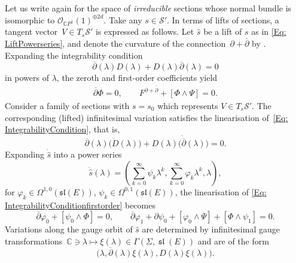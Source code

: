 \documentclass[pdftex]{sigma}
\numberwithin{equation}{section}
\theoremstyle{definition}
\newcommand{\lie}[1]{\operatorname{\mathfrak{#1}}}
\newcommand{\sln}{\lie{sl}}
\newcommand\C{{\mathbb C}}
\begin{document}
Let us write again  for the space of \emph{irreducible}
sections whose normal bundle is isomorphic to $\mathcal{O}_{\C P^1}(1)^{\oplus 2d}$. Take any $s \in
\mathcal S'$. In terms of lifts of sections, a tangent vector~${V\in T_s \mathcal{S}'}$ is expressed as
follows. Let $\widehat{s}$ be a lift of $s$ as in \eqref{Eq: LiftPowerseries}, and denote the
curvature of the connection~${\partial+{\overline{\partial}}}$ by . Expanding the integrability
condition
\begin{equation}\label{Eq: IntegrabilityCondition}
\overline{\partial}(\lambda)D(\lambda) + D(\lambda)\overline{\partial}(\lambda) = 0
\end{equation}
in powers of $\lambda$, the zeroth and first-order coefficients yield
\begin{align}\label{Eq: IntegrabilityConditionfirstorder}
\overline{\partial}\Phi = 0,\qquad
F^{\partial + {\overline{\partial}}} + [\Phi\wedge \Psi] = 0 .
\end{align}
Consider a family of sections  with $s = s_0$ which
represents $V \in T_s \mathcal{S}'$.
The corresponding (lifted) infinitesimal variation  satisfies the linearisation
of~\eqref{Eq: IntegrabilityCondition}, that is,
\begin{equation}\label{Eq: Intsdot}
{\overline{\partial}}(\lambda)\bigl(\dot D(\lambda)\bigr) + D(\lambda)\bigl(\dot{{\overline{\partial}}}(\lambda)\bigr) = 0.
\end{equation}
Expanding $\dot{\widehat{s}}$ into a power series
 \[%
\dot{\widehat{s}}(\lambda) = \left(\sum_{k=0}^\infty\psi_k\lambda^k,
\sum_{k=0}^\infty \varphi_k\lambda^k, \lambda \right) ,
\]
for $\varphi_k \in \Omega^{1,0}(\mathfrak{sl}(E))$, $\psi_k \in \Omega^{0,1}(\mathfrak{sl}(E))$, the linearisation
of \eqref{Eq: IntegrabilityConditionfirstorder} becomes
\[%
\overline{\partial}\varphi_0 + [\psi_0\wedge\Phi] = 0,\qquad
\overline{\partial}\varphi_1 + \partial\psi_0 + [\varphi_0\wedge \Psi] + [\Phi\wedge \psi_1] = 0 .
\]
Variations along the gauge orbit of $\widehat{s}$ are determined by infinitesimal gauge
transformations~${\C \ni \lambda \longmapsto \xi(\lambda) \in
\Gamma(\Sigma, \sln(E))}$ and are of the form
\begin{equation}\label{Eq:InfGauge}
\bigl(\lambda, {\overline{\partial}}(\lambda) \xi(\lambda), D(\lambda) \xi(\lambda)\bigr).
\end{equation}
\end{document}
